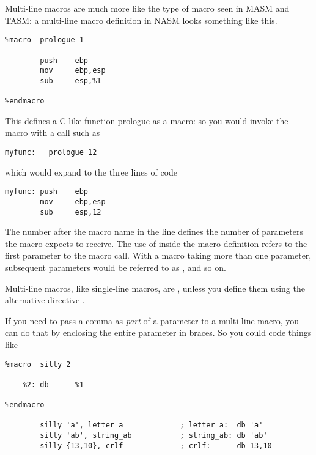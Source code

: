 
Multi-line macros are much more like the type of macro seen in MASM
and TASM: a multi-line macro definition in NASM looks something like
this.

\begin{lstlisting}
%macro  prologue 1

        push    ebp
        mov     ebp,esp
        sub     esp,%1

%endmacro
\end{lstlisting}

This defines a C-like function prologue as a macro: so you would
invoke the macro with a call such as

\begin{minipage}{\linewidth}
\begin{lstlisting}
myfunc:   prologue 12
\end{lstlisting}
\end{minipage}

which would expand to the three lines of code

\begin{lstlisting}
myfunc: push    ebp
        mov     ebp,esp
        sub     esp,12
\end{lstlisting}

The number  after the macro name in the  line
defines the number of parameters the macro  expects
to receive. The use of  inside the macro definition refers
to the first parameter to the macro call. With a macro taking more
than one parameter, subsequent parameters would be referred to as
,  and so on.

Multi-line macros, like single-line macros, are ,
unless you define them using the alternative directive .

If you need to pass a comma as \emph{part} of a parameter to a
multi-line macro, you can do that by enclosing the entire parameter
in braces. So you could code
things like

\begin{lstlisting}
%macro  silly 2

    %2: db      %1

%endmacro

        silly 'a', letter_a             ; letter_a:  db 'a'
        silly 'ab', string_ab           ; string_ab: db 'ab'
        silly {13,10}, crlf             ; crlf:      db 13,10
\end{lstlisting}

